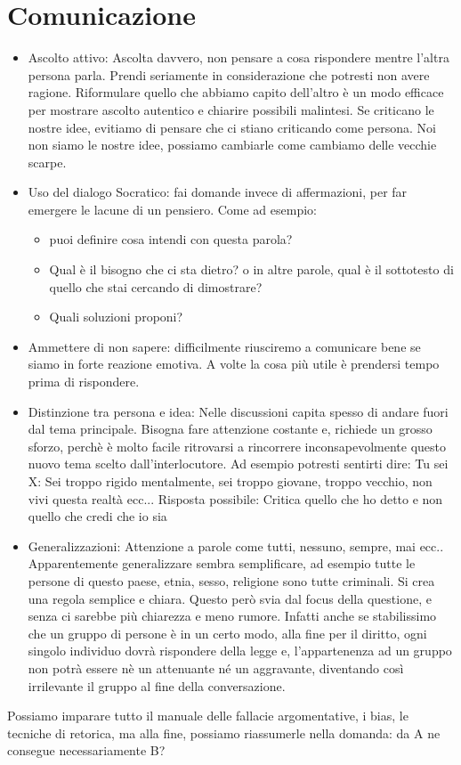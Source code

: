 \documentclass[12pt]{book} %
\begin{document}
\clearpage\section{Comunicazione}

\begin{mdframed}[linewidth=1pt]
\begin{itemize} 
\item Ascolto attivo: Ascolta davvero, non pensare a cosa rispondere mentre l'altra persona parla. Prendi seriamente in considerazione che potresti non avere ragione. 
Riformulare quello che abbiamo capito dell’altro è un modo efficace per mostrare ascolto autentico e chiarire possibili malintesi. Se criticano le nostre idee, evitiamo di pensare che ci stiano criticando come persona. Noi non siamo le nostre idee, possiamo cambiarle come cambiamo delle vecchie scarpe. 
\item Uso del dialogo Socratico: fai domande invece di affermazioni, per far emergere le lacune di un pensiero. Come ad esempio: 
\begin{itemize}
\item puoi definire cosa intendi con questa parola?
\item Qual è il bisogno che ci sta dietro? o in altre parole, qual è il sottotesto di quello che stai cercando di dimostrare? 
\item Quali soluzioni proponi? 
\end{itemize}
\item Ammettere di non sapere: difficilmente riusciremo a comunicare bene se siamo in forte reazione emotiva. A volte la cosa più utile è prendersi tempo prima di rispondere. 
\item Distinzione tra persona e idea: Nelle discussioni capita spesso di andare fuori dal tema principale. Bisogna fare attenzione costante e, richiede un grosso sforzo, perchè è molto facile ritrovarsi a rincorrere inconsapevolmente questo nuovo tema scelto dall'interlocutore. 
Ad esempio potresti sentirti dire: Tu sei X: Sei troppo rigido mentalmente, sei troppo giovane, troppo vecchio, non vivi questa realtà ecc...
Risposta possibile: Critica quello che ho detto e non quello che credi che io sia
\item Generalizzazioni: Attenzione a parole come tutti, nessuno, sempre, mai ecc.. Apparentemente generalizzare sembra semplificare, ad esempio tutte le persone di questo paese, etnia, sesso, religione sono tutte criminali. Si crea una regola semplice e chiara. Questo però svia dal focus della questione, e senza ci sarebbe più chiarezza e meno rumore. Infatti anche se stabilissimo che un gruppo di persone è in un certo modo, alla fine per il diritto, ogni singolo individuo dovrà rispondere della legge e, l'appartenenza ad un gruppo non potrà essere nè un attenuante né un aggravante, diventando così irrilevante il gruppo al fine della conversazione.
\end{itemize}

Possiamo imparare tutto il manuale delle fallacie argomentative, i bias, le tecniche di retorica, ma alla fine, possiamo riassumerle nella domanda: da A ne consegue necessariamente B?
\end{mdframed}
\end{document}
